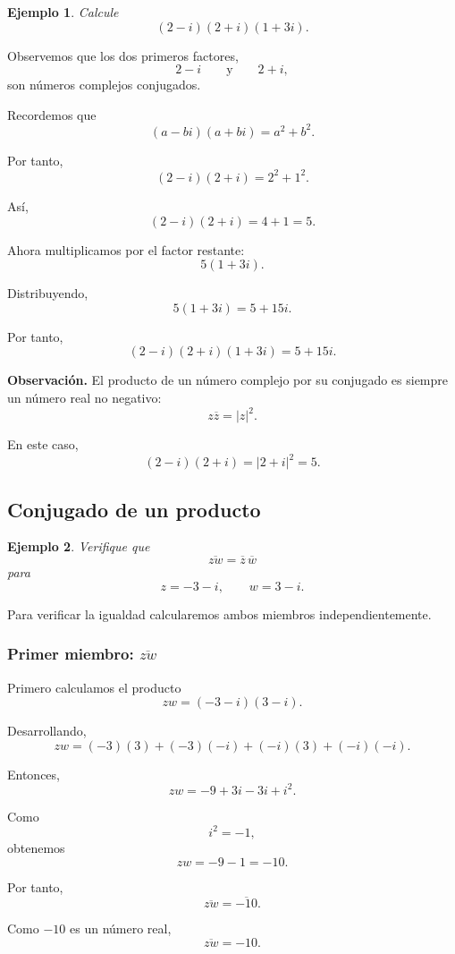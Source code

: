 \documentclass[12pt]{article}
\newtheorem{Ejem}{Ejemplo}
\begin{document}
\begin{Ejem}
Calcule
\[
(2-i)(2+i)(1+3i).
\]
\end{Ejem}

Observemos que los dos primeros factores,
\[
2-i
\qquad\text{y}\qquad
2+i,
\]
son números complejos conjugados.

Recordemos que
\[
(a-bi)(a+bi)=a^2+b^2.
\]

Por tanto,
\[
(2-i)(2+i)
=
2^2+1^2.
\]

Así,
\[
(2-i)(2+i)=4+1=5.
\]

Ahora multiplicamos por el factor restante:
\[
5(1+3i).
\]

Distribuyendo,
\[
5(1+3i)=5+15i.
\]

Por tanto,
\[
\boxed{
(2-i)(2+i)(1+3i)=5+15i
}.
\]

\medskip

\noindent
\textbf{Observación.}
El producto de un número complejo por su conjugado es siempre
un número real no negativo:
\[
z\overline z=|z|^2.
\]

En este caso,
\[
(2-i)(2+i)=|2+i|^2=5.
\]

\subsection{Conjugado de un producto}

\begin{Ejem}
Verifique que
\[
\overline{zw}=\overline z\,\overline w
\]
para
\[
z=-3-i,
\qquad
w=3-i.
\]
\end{Ejem}

Para verificar la igualdad calcularemos ambos miembros
independientemente.

\subsubsection*{Primer miembro: $\overline{zw}$}

Primero calculamos el producto
\[
zw=(-3-i)(3-i).
\]

Desarrollando,
\[
zw
=
(-3)(3)+(-3)(-i)+(-i)(3)+(-i)(-i).
\]

Entonces,
\[
zw
=
-9+3i-3i+i^2.
\]

Como
\[
i^2=-1,
\]
obtenemos
\[
zw=-9-1=-10.
\]

Por tanto,
\[
\overline{zw}
=
\overline{-10}.
\]

Como $-10$ es un número real,
\[
\boxed{\overline{zw}=-10}.
\]
\end{document}
